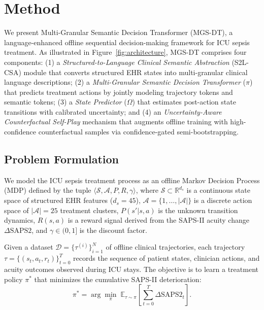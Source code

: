 
\section{Method}
\label{sec:method}

We present Multi-Granular Semantic Decision Transformer (MGS-DT), a language-enhanced offline sequential decision-making framework for ICU sepsis treatment. As illustrated in Figure~\ref{fig:architecture}, MGS-DT comprises four components: (1) a \textit{Structured-to-Language Clinical Semantic Abstraction} (S2L-CSA) module that converts structured EHR states into multi-granular clinical language descriptions; (2) a \textit{Multi-Granular Semantic Decision Transformer} ($\pi$) that predicts treatment actions by jointly modeling trajectory tokens and semantic tokens; (3) a \textit{State Predictor} ($\Omega$) that estimates post-action state transitions with calibrated uncertainty; and (4) an \textit{Uncertainty-Aware Counterfactual Self-Play} mechanism that augments offline training with high-confidence counterfactual samples via confidence-gated semi-bootstrapping.

\subsection{Problem Formulation}
\label{sec:problem}

We model the ICU sepsis treatment process as an offline Markov Decision Process (MDP) defined by the tuple $\langle \mathcal{S}, \mathcal{A}, P, R, \gamma \rangle$, where $\mathcal{S} \subset \mathbb{R}^{d_s}$ is a continuous state space of structured EHR features ($d_s = 45$), $\mathcal{A} = \{1, \ldots, |\mathcal{A}|\}$ is a discrete action space of $|\mathcal{A}| = 25$ treatment clusters, $P(s'|s,a)$ is the unknown transition dynamics, $R(s,a)$ is a reward signal derived from the SAPS-II acuity change $\Delta\text{SAPS2}$, and $\gamma \in (0,1]$ is the discount factor.

Given a dataset $\mathcal{D} = \{\tau^{(i)}\}_{i=1}^{N}$ of offline clinical trajectories, each trajectory $\tau = \{(s_t, a_t, r_t)\}_{t=0}^{T}$ records the sequence of patient states, clinician actions, and acuity outcomes observed during ICU stays. The objective is to learn a treatment policy $\pi^*$ that minimizes the cumulative SAPS-II deterioration:
\begin{equation}
    \pi^* = \arg\min_{\pi} \; \mathbb{E}_{\tau \sim \pi}\left[\sum_{t=0}^{T} \Delta\text{SAPS2}_t\right].
\end{equation}

